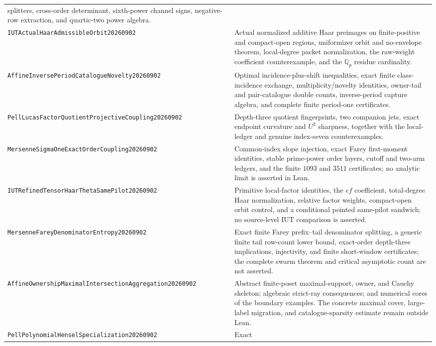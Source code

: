 \documentclass[11pt]{amsart}
\theoremstyle{definition}
\theoremstyle{remark}
\newcommand{\Q}{\mathbb Q}
\begin{document}
\begin{longtable}{>{\raggedright\arraybackslash}p{}>{\raggedright\arraybackslash}p{}}
splitters, cross-order determinant, sixth-power channel signs, negative-row
extraction, and quartic-two power algebra.\\[3pt]
\texttt{IUTActualHaarAdmissible\allowbreak Orbit20260902} & Actual normalized
additive Haar preimages on finite-positive and compact-open regions,
uniformizer orbit and no-envelope theorem, local-degree packet normalization,
the raw-weight coefficient counterexample, and the $\Q_p$ residue cardinality.\\[3pt]
\texttt{AffineInversePeriodCatalogue\allowbreak Novelty20260902} & Optimal
incidence-plus-shift inequalities, exact finite class-incidence exchange,
multiplicity/novelty identities, owner-tail and pair-catalogue double counts,
inverse-period capture algebra, and complete finite period-one certificates.\\[3pt]
\texttt{PellLucasFactorQuotientProjective\allowbreak Coupling20260902} &
Depth-three quotient fingerprints, two companion jets, exact endpoint
curvature and $U^2$ sharpness, together with the local-ledger and genuine
index-seven counterexamples.\\[3pt]
\texttt{MersenneSigmaOneExactOrder\allowbreak Coupling20260902} & Common-index
slope injection, exact Farey first-moment identities, stable prime-power
order layers, cutoff and two-arm ledgers, and the finite $1093$ and $3511$
certificates; no analytic limit is asserted in Lean.\\[3pt]
\texttt{IUTRefinedTensorHaarTheta\allowbreak SamePilot20260902} & Primitive
local-factor identities, the $ef$ coefficient, total-degree Haar
normalization, relative factor weights, compact-open orbit control, and a
conditional pointed same-pilot sandwich; no source-level IUT comparison is
asserted.\\[3pt]
\texttt{MersenneFareyDenominator\allowbreak Entropy20260902} & Exact finite
Farey prefix--tail denominator splitting, a generic finite tail row-count
lower bound, exact-order depth-three implications, injectivity, and finite
short-window certificates; the complete swarm theorem and critical
asymptotic count are not asserted.\\[3pt]
\texttt{AffineOwnershipMaximalIntersection\allowbreak Aggregation20260902} &
Abstract finite-poset maximal-support, owner, and Cauchy skeleton; algebraic
strict-ray consequences; and numerical cores of the boundary examples.  The
concrete maximal cover, large-label migration, and catalogue-sparsity estimate
remain outside Lean.\\[3pt]
\texttt{PellPolynomialHensel\allowbreak Specialization20260902} & Exact

\end{longtable}
\end{document}
